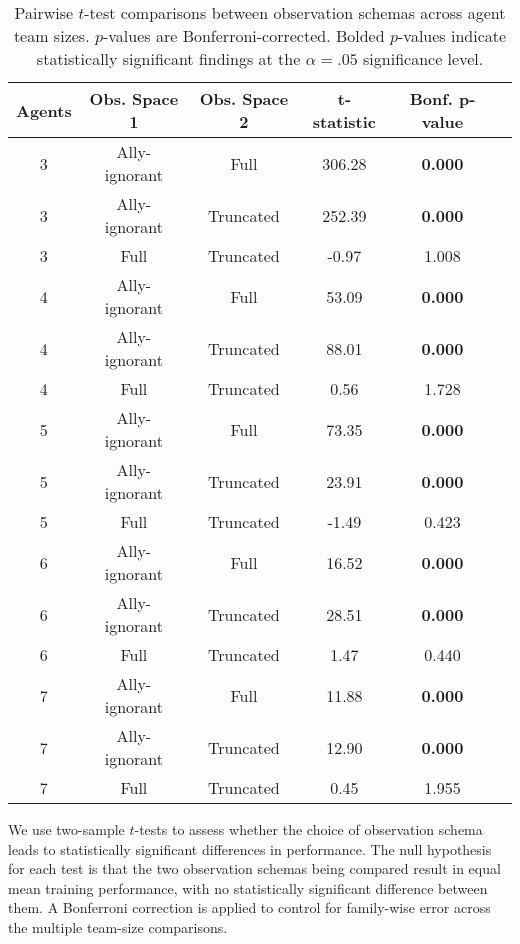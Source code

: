 \begin{table}[!ht]
    \centering
    \caption{Pairwise $t$-test comparisons between observation schemas across agent team sizes. 
    $p$-values are Bonferroni-corrected. Bolded $p$-values indicate statistically significant 
    findings at the $\alpha = .05$ significance level.
    }
    \label{con1:tab:observation_comparisons}
    \begin{tabular}{cccccc}
    \toprule
    \textbf{Agents} & \multicolumn{1}{c}{\textbf{Obs. Space 1}} & 
    \multicolumn{1}{c}{\textbf{Obs. Space 2}} & \textbf{t-statistic} & \textbf{Bonf. p-value} \\
    \midrule
    3 & Ally-ignorant & Full            & 306.28  & \textbf{0.000} \\
    3 & Ally-ignorant & Truncated       & 252.39  & \textbf{0.000} \\
    3 & Full          & Truncated       & -0.97   & 1.008 \\
    4 & Ally-ignorant & Full            & 53.09   & \textbf{0.000} \\
    4 & Ally-ignorant & Truncated       & 88.01   & \textbf{0.000} \\
    4 & Full          & Truncated       & 0.56    & 1.728 \\
    5 & Ally-ignorant & Full            & 73.35   & \textbf{0.000} \\
    5 & Ally-ignorant & Truncated       & 23.91   & \textbf{0.000} \\
    5 & Full          & Truncated       & -1.49   & 0.423 \\
    6 & Ally-ignorant & Full            & 16.52   & \textbf{0.000} \\
    6 & Ally-ignorant & Truncated       & 28.51   & \textbf{0.000} \\
    6 & Full          & Truncated       & 1.47    & 0.440 \\
    7 & Ally-ignorant & Full            & 11.88   & \textbf{0.000} \\
    7 & Ally-ignorant & Truncated       & 12.90   & \textbf{0.000} \\
    7 & Full          & Truncated       & 0.45    & 1.955 \\
    \bottomrule
    \end{tabular}
\end{table}

We use two-sample \(t\)-tests to assess whether the choice of observation 
schema leads to statistically significant differences in performance.
The null hypothesis for each test is that the two observation schemas 
being compared result in equal mean training performance, 
with no statistically significant difference between them.
A Bonferroni correction is applied to control for family-wise error 
across the multiple team-size comparisons.

